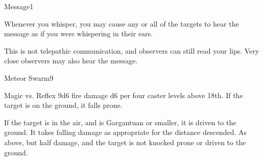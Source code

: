 \begin{spellsection}{Message}{1}
\begin{spellheader}
\end{spellheader}
\begin{spellcontent}
    \begin{spelltargetinginfo}
    \end{spelltargetinginfo}
    \begin{spelleffects}
        \spelleffect Whenever you whisper, you may cause any or all of the targets to hear the message as if you were whispering in their ears.
        \spelldur \durlong
    \end{spelleffects}
\end{spellcontent}
\begin{spellfooter}
    \spellnotes This is not telepathic communication, and observers can still read your lips. Very close observers may also hear the message.
\end{spellfooter}
\end{spellsection}

\begin{spellsection}{Meteor Swarm}{9}
\begin{spellheader}
    \spellrng{\rnglong}
\end{spellheader}
\begin{spellcontent}
    \begin{spelltargetinginfo}
    \end{spelltargetinginfo}
    \begin{spelleffects}
        \begin{spellattack}{Magic vs. Reflex}
            \spellsuccess 9d6 fire damage \add d6 per four caster levels above 18th. If the target is on the ground, it falls prone.

            If the target is in the air, and is Gargantuan or smaller, it is driven to the ground. It takes falling damage as appropriate for the distance descended.
            \spellfailure As above, but half damage, and the target is not knocked prone or driven to the ground.
        \end{spellattack}
    \end{spelleffects}
\end{spellcontent}
\begin{spellfooter}
    \spellnotes \firespellnotes

    \destructivespellnotes
\end{spellfooter}
\end{spellsection}

